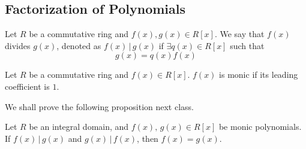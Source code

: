 
\subsection{Factorization of Polynomials}%
\label{sub:factorization_of_polynomials}

\begin{defn}
\label{defn:division_of_polynomials}
  Let $R$ be a commutative ring and $f(x), g(x) \in R[x]$. We say that $f(x)$ divides $g(x)$, denoted as $f(x) \, | \, g(x)$ if $\exists q(x) \in R[x]$ such that
  \begin{equation*}
    g(x) = q(x) f(x)
  \end{equation*}
\end{defn}

\begin{defn}
\label{defn:monic_polynomial}
  Let $R$ be a commutative ring and $f(x) \in R[x]$. $f(x)$ is monic if its leading coefficient is $1$.
\end{defn}

We shall prove the following proposition next class.

\begin{propononum}
  Let $R$ be an integral domain, and $f(x), \, g(x) \in R[x]$ be monic polynomials. If $f(x) \, | \, g(x)$ and $g(x) \, | \, f(x)$, then $f(x) = g(x)$.
\end{propononum}



